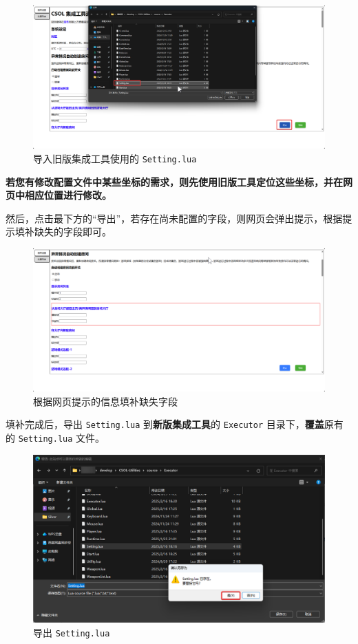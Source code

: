 \begin{figure}[H]
    \Centering
    \includegraphics[width=\textwidth]{docs/assets/import_setting}
    \caption{导入旧版集成工具使用的 \lstinline{Setting.lua}}
\end{figure}

\textbf{\color{red}若您有修改配置文件中某些坐标的需求，则先使用旧版工具定位这些坐标，并在网页中相应位置进行修改。}

然后，点击最下方的“导出”，若存在尚未配置的字段，则网页会弹出提示，根据提示填补缺失的字段即可。

\begin{figure}[H]
    \Centering
    \includegraphics[width=\textwidth]{docs/assets/export_error}
    \caption{根据网页提示的信息填补缺失字段}
\end{figure}

填补完成后，导出 \lstinline{Setting.lua} 到\textbf{\color{red}新版集成工具}的 \lstinline{Executor} 目录下，\textbf{\color{red}覆盖}原有的 \lstinline{Setting.lua} 文件。

\begin{figure}[H]
    \Centering
    \includegraphics[width=\textwidth]{docs/assets/override_setting}
    \caption{导出 \lstinline{Setting.lua}}
\end{figure}


